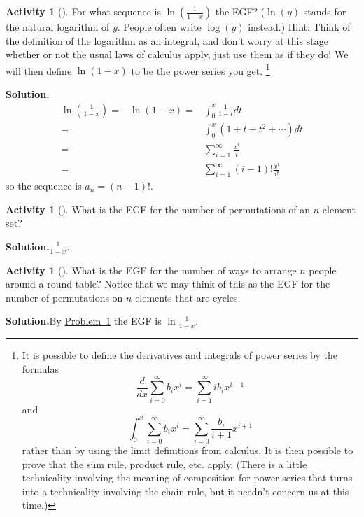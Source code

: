 \documentclass[10pt,]{book}
\theoremstyle{plain}
\theoremstyle{definition}
\newtheorem{activity}[project]{Activity}
\numberwithin{equation}{chapter}
\newcommand{\amp}{&}
\begin{document}
\begin{activity}[]\label{ln1over1-x}
For what sequence is \(\ln(\frac{1}{1-x})\) the EGF? (\(\ln (y)\) stands for the natural logarithm of \(y\). People often write \(\log(y)\) instead.) Hint: Think of the definition of the logarithm as an integral, and don't worry at this stage whether or not the usual laws of calculus apply, just use them as if they do! We will then define \(\ln({ 1-x})\) to be the power series you get. \footnote{It is possible to define the derivatives and integrals of power series by the formulas%
\begin{equation*}
\frac{d}{dx}
\sum_{i=0}^\infty b_ix^i = \sum_{i=1}^\infty ib_ix^{i-1}
\end{equation*}
and%
\begin{equation*}
\int_0^x
\sum_{i=0}^\infty b_ix^i = \sum_{i=0}^\infty \frac{b_i}{i+1}x^{i+1}
\end{equation*}
rather than by using the limit definitions from calculus.  It is then possible to prove that the sum rule, product rule, etc. apply.  (There is a little technicality involving the meaning of composition for power series that turns into a technicality involving the chain rule, but it needn't concern us at this time.)\label{fn-25}}%
\par\medskip\noindent%
\textbf{Solution.}\quad %
\begin{align*}
\ln(\frac{1}{1-x}) =-\ln(1-x)  =\amp
\int_0^x \frac{1}{1-t}dt\\
=\amp \int_0^x (1+t+t^2+\cdots)dt\\
=\amp \sum_{i=1}^\infty \frac{x^i}{i}\\
=\amp  \sum_{i=1}^\infty (i-1)!\frac{x^i}{i!}
\end{align*}
so the sequence is \(a_n = (n-1)!\).%
\end{activity}
\begin{activity}[]\label{exponentialpermutations}
What is the EGF for the number of permutations of an \(n\)-element set?%
\par\medskip\noindent%
\textbf{Solution.}\quad \(\frac{1}{1-x}\).%
\end{activity}
\begin{activity}[]\label{exponentialroundtable}
What is the EGF for the number of ways to arrange \(n\) people around a round table? Notice that we may think of this as the EGF for the number of permutations on \(n\) elements that are cycles.%
\par\medskip\noindent%
\textbf{Solution.}\quad By \hyperref[ln1over1-x]{Problem~\ref{ln1over1-x}} the EGF is \(\ln\frac{1}{1-x}\).%
\end{activity}
\end{document}

